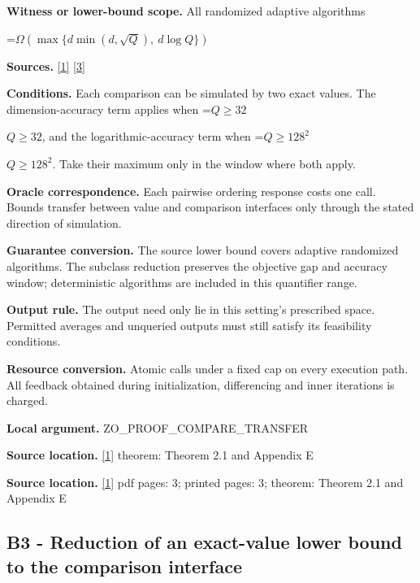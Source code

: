 \documentclass[10pt,a4paper]{article}
\newcommand{\AtlasMath}[1]{\par\begingroup\centering\setbox0=\hbox{$\displaystyle #1$}\ifdim\wd0>1.4\linewidth\typeout{ATLAS WIDE FORMULA: \the\wd0}\fi\ifdim\wd0>\linewidth\resizebox{\linewidth}{!}{\box0}\else\box0\fi\par\endgroup}
\newcommand{\AtlasInlineMath}[1]{\begingroup\setbox0=\hbox{$#1$}\ifdim\wd0>.4\linewidth\endgroup\AtlasMath{#1}\else\endgroup$#1$\fi}
\begin{document}
\textbf{Witness or lower-bound scope.} All randomized adaptive algorithms



\AtlasMath{\Omega\!\left(\max\{d\min(d,\sqrt Q),\ d\log Q\}\right)}


\textbf{Sources.} \href{https://arxiv.org/html/2610.00345v1}{[1]} \href{https://arxiv.org/html/2610.19652v1}{[3]}



\textbf{Conditions.} Each comparison can be simulated by two exact values. The dimension-accuracy term applies when \AtlasInlineMath{Q\ge32}, and the logarithmic-accuracy term when \AtlasInlineMath{Q\ge128^2}. Take their maximum only in the window where both apply.



\textbf{Oracle correspondence.} Each pairwise ordering response costs one call. Bounds transfer between value and comparison interfaces only through the stated direction of simulation.



\textbf{Guarantee conversion.} The source lower bound covers adaptive randomized algorithms. The subclass reduction preserves the objective gap and accuracy window; deterministic algorithms are included in this quantifier range.



\textbf{Output rule.} The output need only lie in this setting's prescribed space. Permitted averages and unqueried outputs must still satisfy its feasibility conditions.



\textbf{Resource conversion.} Atomic calls under a fixed cap on every execution path. All feedback obtained during initialization, differencing and inner iterations is charged.



\textbf{Local argument.} ZO\_PROOF\_COMPARE\_TRANSFER



\textbf{Source location.} \href{https://arxiv.org/html/2610.00345v1}{[1]} theorem: Theorem 2.1 and Appendix E



\textbf{Source location.} \href{https://arxiv.org/html/2610.00345v1}{[1]} pdf pages: 3; printed pages: 3; theorem: Theorem 2.1 and Appendix E



\subsection{B3 - Reduction of an exact-value lower bound to the comparison interface}
\end{document}
